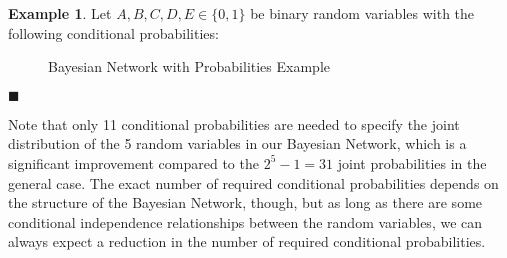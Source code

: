 \documentclass{article}
\theoremstyle{definition}
\newtheorem{example}{Example}
\newenvironment{exampleqed}
    {\begin{example}}
    {\hfill \qedsymbol \end{example}}
\renewcommand{\qedsymbol}{\(\blacksquare\)}
\renewcommand{\P}{\mathbb{P}}
\begin{document}
\begin{exampleqed} \label{ex:bayesian_network_prob}
    Let \(A, B, C, D, E \in \{0, 1\}\) be binary random variables with the following conditional probabilities:

    \begin{figure}[htbp]
        \centering
        \caption{Bayesian Network with Probabilities Example}
        \label{fig:bayesian_network_probs}
    \end{figure}
\end{exampleqed}

Note that only 11 conditional probabilities are needed to specify the joint distribution of the 5 random variables in our Bayesian Network, which is a significant improvement compared to the \(2^5 - 1 = 31\) joint probabilities in the general case. The exact number of required conditional probabilities depends on the structure of the Bayesian Network, though, but as long as there are some conditional independence relationships between the random variables, we can always expect a reduction in the number of required conditional probabilities.
\end{document}
